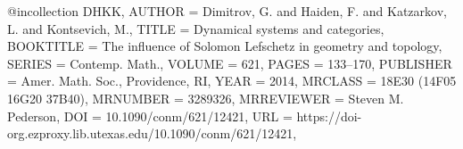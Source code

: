 @incollection {DHKK,
    AUTHOR = {Dimitrov, G. and Haiden, F. and Katzarkov, L. and Kontsevich,
              M.},
     TITLE = {Dynamical systems and categories},
 BOOKTITLE = {The influence of {S}olomon {L}efschetz in geometry and
              topology},
    SERIES = {Contemp. Math.},
    VOLUME = {621},
     PAGES = {133--170},
 PUBLISHER = {Amer. Math. Soc., Providence, RI},
      YEAR = {2014},
   MRCLASS = {18E30 (14F05 16G20 37B40)},
  MRNUMBER = {3289326},
MRREVIEWER = {Steven M. Pederson},
       DOI = {10.1090/conm/621/12421},
       URL = {https://doi-org.ezproxy.lib.utexas.edu/10.1090/conm/621/12421},
}
	
